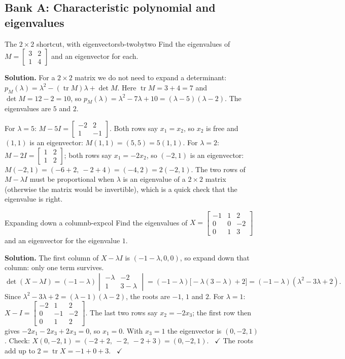 \documentclass[11pt]{article}
\begin{document}
\subsection*{Bank A: Characteristic polynomial and eigenvalues}
\begin{exmp}{The $2\times2$ shortcut, with eigenvectors}{b-twobytwo}
Find the eigenvalues of $M=\begin{bmatrix}3&2\\1&4\end{bmatrix}$ and an eigenvector for each.

\textbf{Solution.} For a $2\times2$ matrix we do not need to expand a determinant: $p_M(\lambda)=\lambda^2-(\operatorname{tr}M)\lambda+\det M$. Here $\operatorname{tr}M=3+4=7$ and $\det M=12-2=10$, so $p_M(\lambda)=\lambda^2-7\lambda+10=(\lambda-5)(\lambda-2)$. The eigenvalues are $5$ and $2$.

For $\lambda=5$: $M-5I=\begin{bmatrix}-2&2\\1&-1\end{bmatrix}$. Both rows say $x_1=x_2$, so $x_2$ is free and $(1,1)$ is an eigenvector: $M(1,1)=(5,5)=5(1,1)$. For $\lambda=2$: $M-2I=\begin{bmatrix}1&2\\1&2\end{bmatrix}$; both rows say $x_1=-2x_2$, so $(-2,1)$ is an eigenvector: $M(-2,1)=(-6+2,\ -2+4)=(-4,2)=2(-2,1)$. The two rows of $M-\lambda I$ must be proportional when $\lambda$ is an eigenvalue of a $2\times2$ matrix (otherwise the matrix would be invertible), which is a quick check that the eigenvalue is right.
\end{exmp}

\begin{exmp}{Expanding down a column}{b-expcol}
Find the eigenvalues of $X=\begin{bmatrix}-1&1&2\\0&0&-2\\0&1&3\end{bmatrix}$ and an eigenvector for the eigenvalue $1$.

\textbf{Solution.} The first column of $X-\lambda I$ is $(-1-\lambda,0,0)$, so expand down that column: only one term survives.
\[
\det(X-\lambda I)=(-1-\lambda)\begin{vmatrix}-\lambda&-2\\1&3-\lambda\end{vmatrix}=(-1-\lambda)\bigl[-\lambda(3-\lambda)+2\bigr]=(-1-\lambda)(\lambda^2-3\lambda+2).
\]
Since $\lambda^2-3\lambda+2=(\lambda-1)(\lambda-2)$, the roots are $-1$, $1$ and $2$. For $\lambda=1$: $X-I=\begin{bmatrix}-2&1&2\\0&-1&-2\\0&1&2\end{bmatrix}$. The last two rows say $x_2=-2x_3$; the first row then gives $-2x_1-2x_3+2x_3=0$, so $x_1=0$. With $x_3=1$ the eigenvector is $(0,-2,1)$. Check: $X(0,-2,1)=(-2+2,\ -2,\ -2+3)=(0,-2,1)$. \ $\checkmark$ The roots add up to $2=\operatorname{tr}X=-1+0+3$. \ $\checkmark$
\end{exmp}
\end{document}
